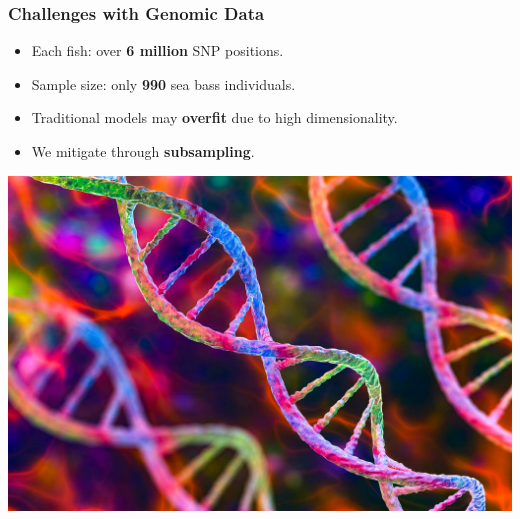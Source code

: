 \documentclass[aspectratio=169]{beamer}
\begin{document}
\begin{frame}
\frametitle{Challenges with Genomic Data}
\begin{minipage}[c]{0.5\textwidth}
\begin{itemize}
  \item Each fish: over \textbf{6 million} SNP positions.
  \item Sample size: only \textbf{990} sea bass individuals.
  \item Traditional models may \textbf{overfit} due to high dimensionality.
  \item We mitigate through \textbf{subsampling}.
\end{itemize}
\end{minipage}
\begin{minipage}[c]{0.49\textwidth}
  \includegraphics[width=\linewidth]{figures/dna.jpg}
\end{minipage}
\end{frame}
\end{document}
